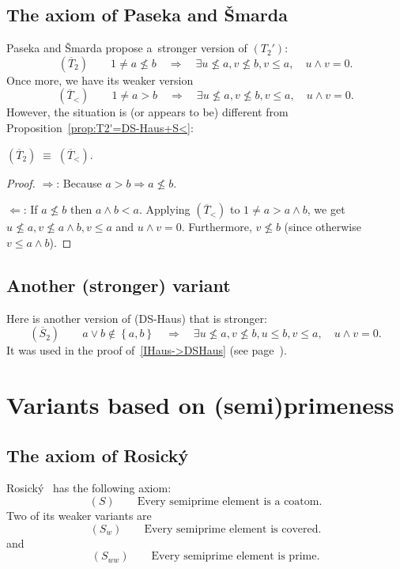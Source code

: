 \subsection{The axiom of Paseka and Šmarda}
Paseka and Šmarda \cite{paseka-smarda92} propose a~stronger version of
$(T_2')$:
\[
  (\overline{T}_2) \qquad
  1 \ne a\not\le b \quad \Rightarrow \quad \exists u\not\leq a, v\not\leq b,
  \boxed{v \le a}, \quad u \wedge v = 0.
\]
Once more, we have its weaker version
\[
  (\overline{T}_<) \qquad
  1 \ne a > b \quad \Rightarrow \quad \exists u\not\leq a, v\not\leq b, v \le
  a, \quad u \wedge v = 0.
\]
However, the situation is (or appears to be) different from
Proposition~\ref{prop:T2'=DS-Haus+S<}:
\begin{prop}
  $(\overline{T}_2) \; \equiv \; (\overline{T}_<)$.
\end{prop}
\begin{proof}
  $\Rightarrow$:
  Because $a > b \Rightarrow a \not\le b$.

  $\Leftarrow$:
  If $a\not\le b$ then $a \wedge b < a$.
  Applying $(\overline{T}_<)$ to $1 \ne a > a \wedge b$, we get $u\not\le a,
  v\not\le a \wedge b, v\le a$ and $u \wedge v = 0$.
  Furthermore, $v\not\le b$ (since otherwise $v\le a \wedge b$).
\end{proof}

\subsection{Another (stronger) variant}
Here is another version of (DS-Haus) that is stronger:
\[
  (\overline{S}_2) \qquad
  a \vee b \not\in \left\{a, b\right\} \quad \Rightarrow \quad \exists
  u\not\leq a, v\not\leq b, \boxed{u \le b, v \le a}, \quad u \wedge v = 0.
\]
It was used in the proof of~\ref{IHaus->DSHaus} (see
page~\pageref{sec:overline S2}).

\section{Variants based on (semi)primeness}

\subsection{The axiom of Rosický}
Rosický~\cite{rosicky-smarda85} has the following axiom:
\[
  (S) \qquad
  \text{Every semiprime element is a~coatom.}
\]
Two of its weaker variants are
\[
  (S_w) \qquad
  \text{Every semiprime element is covered.}
\]
and
\[
  (S_{ww}) \qquad
  \text{Every semiprime element is prime.}
\]

